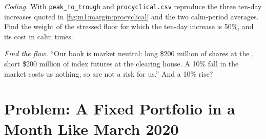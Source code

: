 \begin{exercise}[$\star\star\star$]\label{exo:m1:margin:7}
\emph{Coding.} With \texttt{peak\_to\_trough} and \texttt{procyclical.csv}
reproduce the three ten-day increases quoted in
\cref{fig:m1:margin:procyclical} and the two calm-period averages. Find the
weight of the stressed floor for which the ten-day increase is 50\%, and its
cost in calm times.
\end{exercise}

\begin{exercise}[$\star\star\star$]\label{exo:m1:margin:8}
\emph{Find the flaw.} ``Our book is market neutral: long \$200 million of
shares at the , short \$200 million of index futures at the
clearing house. A 10\% fall in the market costs us nothing, so 
are not a risk for us.'' And a 10\% rise?
\end{exercise}

\section{Problem: A Fixed Portfolio in a Month Like March 2020}

